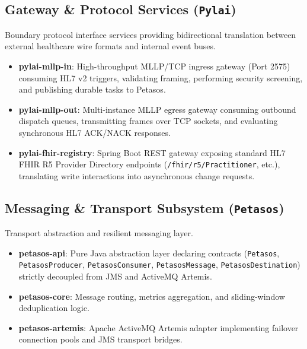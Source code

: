 \subsection{Gateway \& Protocol Services (\texttt{Pylai})}
Boundary protocol interface services providing bidirectional translation between external healthcare wire formats and internal event buses.
\begin{itemize}
    \item \textbf{pylai-mllp-in}: High-throughput MLLP/TCP ingress gateway (Port 2575) consuming HL7 v2 triggers, validating framing, performing security screening, and publishing durable tasks to Petasos.
    \item \textbf{pylai-mllp-out}: Multi-instance MLLP egress gateway consuming outbound dispatch queues, transmitting frames over TCP sockets, and evaluating synchronous HL7 ACK/NACK responses.
    \item \textbf{pylai-fhir-registry}: Spring Boot REST gateway exposing standard HL7 FHIR R5 Provider Directory endpoints (\texttt{/fhir/r5/Practitioner}, etc.), translating write interactions into asynchronous change requests.
\end{itemize}

\subsection{Messaging \& Transport Subsystem (\texttt{Petasos})}
Transport abstraction and resilient messaging layer.
\begin{itemize}
    \item \textbf{petasos-api}: Pure Java abstraction layer declaring contracts (\nolinkurl{Petasos}, \nolinkurl{PetasosProducer}, \nolinkurl{PetasosConsumer}, \nolinkurl{PetasosMessage}, \nolinkurl{PetasosDestination}) strictly decoupled from JMS and ActiveMQ Artemis.
    \item \textbf{petasos-core}: Message routing, metrics aggregation, and sliding-window deduplication logic.
    \item \textbf{petasos-artemis}: Apache ActiveMQ Artemis adapter implementing failover connection pools and JMS transport bridges.
\end{itemize}

